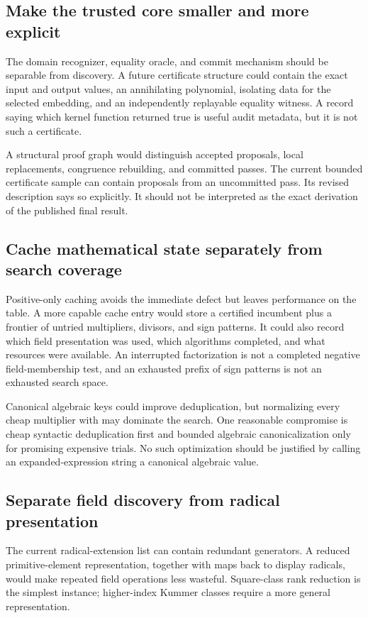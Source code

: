 \documentclass[11pt,a4paper]{article}
\newcommand{\code}[1]{\texttt{\detokenize{#1}}}
\theoremstyle{definition}\newtheorem{definition}[proposition]{Definition}
\theoremstyle{remark}\newtheorem{remark}[proposition]{Remark}
\begin{document}
\subsection{Make the trusted core smaller and more explicit}
The domain recognizer, equality oracle, and commit mechanism should be separable
from discovery. A future certificate structure could contain the exact input
and output values, an annihilating polynomial, isolating data for the selected
embedding, and an independently replayable equality witness. A record saying
which kernel function returned true is useful audit metadata, but it is not
such a certificate.

A structural proof graph would distinguish accepted proposals, local replacements,
congruence rebuilding, and committed passes. The current bounded certificate
sample can contain proposals from an uncommitted pass. Its revised description
says so explicitly. It should not be interpreted as the exact derivation of the
published final result.

\subsection{Cache mathematical state separately from search coverage}
Positive-only caching avoids the immediate defect but leaves performance on the
table. A more capable cache entry would store a certified incumbent plus a
frontier of untried multipliers, divisors, and sign patterns. It could also record
which field presentation was used, which algorithms completed, and what resources
were available. An interrupted factorization is not a completed negative
field-membership test, and an exhausted prefix of sign patterns is not an
exhausted search space.

Canonical algebraic keys could improve deduplication, but normalizing every
cheap multiplier with \code{RootReduce} may dominate the search. One reasonable
compromise is cheap syntactic deduplication first and bounded algebraic
canonicalization only for promising expensive trials. No such optimization
should be justified by calling an expanded-expression string a canonical
algebraic value.

\subsection{Separate field discovery from radical presentation}
The current radical-extension list can contain redundant generators. A reduced
primitive-element representation, together with maps back to display radicals,
would make repeated field operations less wasteful. Square-class rank reduction
is the simplest instance; higher-index Kummer classes require a more general
representation.
\end{document}

